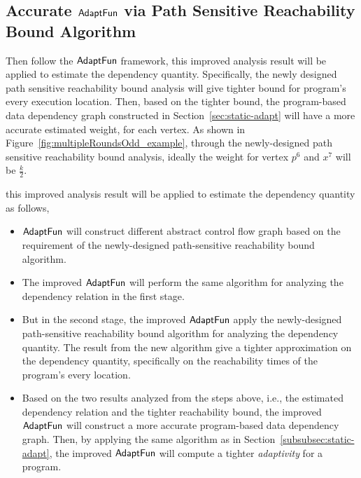 \subsection{Accurate $\textsf{AdaptFun}$ via Path Sensitive Reachability Bound Algorithm}
\label{subsec:refine-static}
Then follow the $\textsf{AdaptFun}$ framework,
this improved analysis result will be applied to estimate the dependency quantity.
Specifically, the newly designed path sensitive reachability bound analysis will 
give tighter bound for program's every execution location.
Then, based on the tighter bound,
the program-based data dependency graph constructed in Section~\ref{sec:static-adapt}
will have a more accurate estimated weight, for each vertex.
%
As shown in Figure~\ref{fig:multipleRoundsOdd_example}, 
through the newly-designed path sensitive reachability bound analysis,
ideally the weight for vertex $p^6$ and $x^7$ will be $\frac{k}{2}$.

this improved analysis result will be applied to estimate the dependency quantity as follows,
\begin{itemize}
    \item $\textsf{AdaptFun}$ will construct different abstract control flow graph based on the requirement of the newly-designed
    path-sensitive reachability bound algorithm.

    \item The improved $\textsf{AdaptFun}$ will perform the same algorithm for analyzing the dependency relation in the first stage.
    \item But in the second stage, the improved $\textsf{AdaptFun}$ 
    apply the newly-designed  path-sensitive reachability bound algorithm for analyzing the dependency quantity.
    The result from the new algorithm 
    give a tighter approximation on the dependency quantity,
    specifically on the reachability times of the program's every location.
    \item Based on the two results analyzed from the steps above, 
    i.e., the estimated dependency relation and the tighter reachability bound, the improved $\textsf{AdaptFun}$ will construct
a more accurate program-based data dependency graph.
Then, by applying the same algorithm as in Section~\ref{subsubsec:static-adapt}, 
the improved $\textsf{AdaptFun}$ will compute a tighter \emph{adaptivity} for a program.%
\end{itemize}


